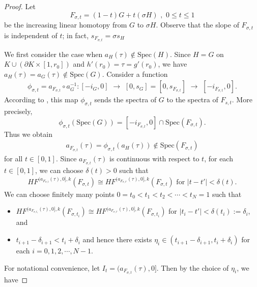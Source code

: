 \documentclass[12pt]{amsart}
\theoremstyle{definition}
\newcommand{\lr}{{\,\,\longrightarrow\,\,}}
\begin{document}
\begin{proof}
\vspace{0.2 cm}

Let $$F_{\sigma,t} = (1-t)G + t (\sigma H)\,\, ,\,\,0\leq t \leq 1$$ be the increasing linear homotopy from $G$ to $\sigma H$. Observe that the slope of $F_{\sigma,t}$ is independent of $t$; in fact, $s_{F_{\sigma,t}} = \sigma s_H$

\vspace{0.2 cm}

We first consider the case when $a_{H}(\tau) \notin \text{Spec}(H)$. Since $H =G$ on $K \cup (\partial K \times [1,r_0])$ and $h'(r_0) = \tau = g'(r_0)$, we have $a_H(\tau) = a_G(\tau) \notin \textrm{Spec}(G)$. Consider a function
\begin{align*}
    \phi_{\sigma,t} = a_{F_{\sigma,t}} \circ a_G^{-1} : [-i_G, 0] \lr [0, s_G]= [0, s_{F_{\sigma,t}}] \lr [-i_{F_{\sigma,t}},0].
\end{align*}
According to \cite{cggm2}, this map $\phi_{\sigma,t}$ sends the spectra of $G$ to the spectra of $F_{s,t}$. More precisely, $$\phi_{\sigma,t}(\textrm{Spec}(G)) = [-i_{F_{\sigma,t}},0] \cap \textrm{Spec}(F_{\sigma,t}).$$ Thus we obtain
\begin{align}\label{isoing}
    a_{F_{\sigma,t}}(\tau) = \phi_{\sigma,t}(a_H(\tau)) \notin \textrm{Spec}(F_{\sigma,t})
\end{align}
for all $t\in[0,1]$. Since $a_{F_{\sigma,t}}(\tau)$ is continuous with respect to $t$, for each $t \in [0,1]$, we can choose $\delta(t) > 0$ such that 
\begin{align*}
    HF^{(a_{F_{\sigma,t}}(\tau),0],k}(F_{\sigma,t}) \cong HF^{(a_{F_{\sigma,t'}}(\tau),0],k}(F_{\sigma,t})\,\,\textrm{for}\,\,|t-t'| < \delta(t).
\end{align*}
We can choose finitely many points $0=t_0 < t_1 < t_2 < \cdots< t_N = 1$ such that \vspace{0.2 cm}
\begin{itemize}
    \item $HF^{(a_{F_{\sigma,t_i}}(\tau),0],k}(F_{\sigma,t_i}) \cong HF^{(a_{F_{\sigma,t'}}(\tau),0],k}(F_{\sigma,t_i})$ for $|t_i-t'| < \delta(t_i) :=\delta_i$, and\vspace{0.3 cm}
    \item $t_{i+1} - \delta_{i+1} < t_{i} + \delta_{i}$ and hence there exists $\eta_i \in (t_{i+1} - \delta_{i+1}, t_{i} + \delta_{i})$ for each $i=0,1,2,\cdots,N-1$.\vspace{0.2 cm}
\end{itemize}
For notational convenience, let $I_{t} = (a_{F_{\sigma,t}}(\tau),0]$. Then by the choice of $\eta_i$, we have

\end{proof}
\end{document}
